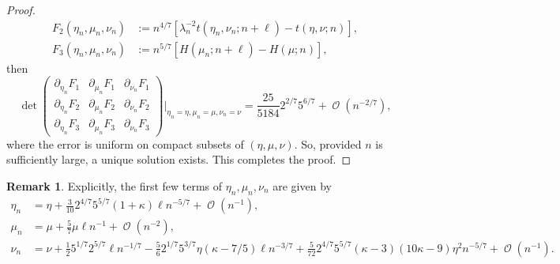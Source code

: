 \documentclass[usenames,dvipsnames]{article}
\theoremstyle{definition}
\newtheorem{remark}{Remark}[section]
\DeclareMathOperator{\OO}{\mathcal{O}}
\numberwithin{equation}{section}
\numberwithin{figure}{section}
\begin{document}
\begin{proof}
\begin{align*}
        F_2(\eta_n,\mu_n,\nu_n)&:=n^{4/7}[\lambda_n^{-2}t(\eta_n,\nu_n;n+\ell) - t(\eta,\nu;n)],\\
        F_3(\eta_n,\mu_n,\nu_n)&:=n^{5/7}[H(\mu_n;n+\ell) -H(\mu;n)],
    \end{align*}
then
    \begin{equation*}
        \det\begin{pmatrix}
            \partial_{\eta_n} F_1 & \partial_{\mu_n} F_1 & \partial_{\nu_n} F_1\\
            \partial_{\eta_n} F_2 & \partial_{\mu_n} F_2 & \partial_{\nu_n} F_2\\
            \partial_{\eta_n} F_3 & \partial_{\mu_n} F_3 & \partial_{\nu_n} F_3
        \end{pmatrix}\bigg|_{\eta_n=\eta,\mu_n=\mu,\nu_n=\nu} = \frac{25}{5184}2^{2/7}5^{6/7} + \OO(n^{-2/7}),
    \end{equation*}
where the error is uniform on compact subsets of $(\eta,\mu,\nu)$. So, provided $n$ is sufficiently large, a unique solution exists. This completes the proof.
\end{proof}

\begin{remark}
    Explicitly, the first few terms of $\eta_n,\mu_n,\nu_n$ are given by
    \begin{align*}
        \eta_n &= \eta + \frac{3}{10} 2^{4/7}5^{5/7}(1+\kappa)\ell n^{-5/7} + \OO(n^{-1}),\\
        \mu_n &= \mu + \frac{5}{7}\mu\ell n^{-1} + \OO(n^{-2}),\\
        \nu_n &= \nu + \frac{1}{2}5^{1/7}2^{5/7}\ell n^{-1/7} -\frac{5}{6}2^{1/7}5^{3/7}\eta(\kappa-7/5)\ell n^{-3/7} + \frac{5}{72}2^{4/7}5^{5/7}(\kappa-3)(10\kappa-9)\eta^2n^{-5/7} + \OO(n^{-1}).
    \end{align*}
\end{remark}
\end{document}
